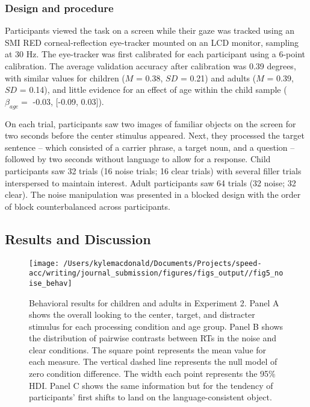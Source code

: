 \documentclass[,man,floatsintext]{apa6}
\begin{document}
\hypertarget{design-and-procedure-1}{%
\subsubsection{Design and procedure}\label{design-and-procedure-1}}

Participants viewed the task on a screen while their gaze was tracked using an SMI RED corneal-reflection eye-tracker mounted on an LCD monitor, sampling at 30 Hz. The eye-tracker was first calibrated for each participant using a 6-point calibration. The average validation accuracy after calibration was 0.39 degrees, with similar values for children (\(M\) = 0.38, \(SD\) = 0.21) and adults (\(M\) = 0.39, \(SD\) = 0.14), and little evidence for an effect of age within the child sample (\(\beta_{age} =\) -0.03, {[}-0.09, 0.03{]}).

On each trial, participants saw two images of familiar objects on the screen for two seconds before the center stimulus appeared. Next, they processed the target sentence -- which consisted of a carrier phrase, a target noun, and a question -- followed by two seconds without language to allow for a response. Child participants saw 32 trials (16 noise trials; 16 clear trials) with several filler trials interspersed to maintain interest. Adult participants saw 64 trials (32 noise; 32 clear). The noise manipulation was presented in a blocked design with the order of block counterbalanced across participants.

\hypertarget{results-and-discussion}{%
\subsection{Results and Discussion}\label{results-and-discussion}}

\begin{figure}[!ht]

{\centering \texttt{[image: /Users/kylemacdonald/Documents/Projects/speed-acc/writing/journal\_submission/figures/figs\_output//fig5\_noise\_behav]} 

}

\caption{Behavioral results for children and adults in Experiment 2. Panel A shows the overall looking to the center, target, and distracter stimulus for each processing condition and age group. Panel B shows the distribution of pairwise contrasts between RTs in the noise and clear conditions. The square point represents the mean value for each measure. The vertical dashed line represents the null model of zero condition difference. The width each point represents the 95\% HDI. Panel C shows the same information but for the tendency of participants' first shifts to land on the language-consistent object.}\label{fig:noise-acc-rt-plot}
\end{figure}
\end{document}

